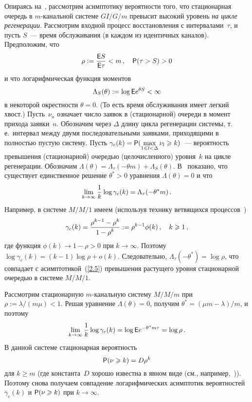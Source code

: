 \begin{multicols}{2}
Опираясь на~\cite{Sadowsky}, рассмотрим асимптотику вероятности
того, что стационарная очередь в $m$-ка\-наль\-ной системе $GI/G/m$
превысит высокий уровень {\it на цикле регенерации}. Рассмотрим
входной процесс восстановления с интервалами~$\tau$, и пусть
$S$~--- время обслуживания (в каждом из идентичных каналов).
Предположим, что
\begin{equation*}
\rho:=\displaystyle\frac{\displaystyle {\sf E} S\mathstrut}{\displaystyle {\sf E} \tau\mathstrut}<m\,, \quad {\sf P}(\tau>S)>0
\end{equation*}
и что логарифмическая функция моментов
$$\Lambda_S(\theta):= \log {\sf E} e^{\theta S}<\infty$$
 в некоторой окрестности $\theta=0$.
(То есть время обслуживания имеет легкий хвост.)
Пусть~$\nu_n$ означает число заявок в (стационарной) очереди в
момент прихода заявки~$n$. Обозначим через $\Delta$ длину цикла
регенерации системы, т.\,е.\ интервал между двумя последовательными
заявками, приходящими в полностью пустую систему. Пусть
$\gamma_c(k)={\sf P}(\max\limits_{1\leqslant l<
\Delta} \nu_l\geqslant k)$~--- вероятность превышения (стационарной)
очередью (целочисленного) уровня~$k$ на цикле регенерации.
 Обозначим $\Lambda(\theta)=\Lambda_\tau(-\theta m)+\Lambda_S(\theta)$. В~\cite{Sadowsky}
 показано, что существует единственное решение $\theta^*>0$ уравнения $\Lambda(\theta)=0$ и что
\begin{equation*}
\lim_{k\to \infty}\displaystyle\frac{\displaystyle 1\mathstrut}{\displaystyle k\mathstrut}\log\gamma_c(k)=\Lambda_\tau(-\theta^* m)\,.
\end{equation*}
Например, в системе $M/M/1$ имеем (используя технику ветвящихся процессов~\cite {BorMor})
\begin{equation*}
\gamma_c (k)= \displaystyle\frac{\displaystyle \rho^{k-1}-\rho^{k}\mathstrut}{\displaystyle 1-\rho^k \mathstrut} :=\rho^{k-1}
\phi(k)\,,\quad k\geqslant 1\,,
\end{equation*}
где функция $\phi(k)\to 1-\rho>0$ при $k\to \infty$. Поэтому $\log \gamma_c(k)=(k-1)\log \rho+o(k)$. Следовательно,
$\Lambda_\tau(-\theta^* )=\log \rho$,
 что совпадает с асимптотикой~(\ref{2.5}) превышения
растущего уровня стационарной очередью в системе $M/M/1$.

Рассмотрим стационарную $m$-канальную систему $M/M/m$ при
$\rho:=\lambda/(m\mu)< 1$. Решая уравнение $\Lambda(\theta)=0$,
получим $\theta^*=(\mu m -\lambda)/m$, и поэтому
$$%
\lim_{k\to \infty}\fr{1}{k}\log\gamma_c(k)=\log \E e^{-\theta^* m
\tau}=\log \rho\,.
$$%
В данной системе стационарная вероятность
$$ {\sf P}(\nu\geqslant k)= D \rho^{k}$$
для $k\ge m$ (где константа~$D$ хорошо известна в явном
виде (см., например,~\cite{Gnedenko})). Поэтому снова получаем
совпадение логарифмических асимптотик вероятностей~$\gamma_c(k)$ и
 $ {\sf P}(\nu\geqslant k)$ при $k\to \infty$.


\end{multicols}
